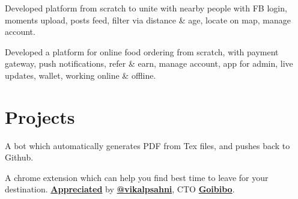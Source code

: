 \documentclass[a4paper]{deedy-resume} %
\begin{document}
\begin{minipage}[t]{0.66\textwidth}
    
    
    Developed platform from scratch to unite with nearby people with FB login, moments upload, posts feed, filter via distance \& age, locate on map, manage account.
    
    \sectionspace %
    
    
    
    Developed a platform for online food ordering from scratch, with payment gateway, push notifications, refer \& earn, manage account, app for admin, live updates, wallet, working online \& offline.
    
    \sectionspace %
    
    \section{Projects}
    
    A bot which automatically generates PDF from Tex files, and pushes back to Github.
    
    \sectionspace %
    
    A chrome extension which can help you find best time to leave for your destination. \href{https://twitter.com/vikalpsahni/status/1014346010200559617}{\bf Appreciated} by \href{https://twitter.com/vikalpsahni}{\bf @vikalpsahni}, CTO \href{https://goibibo.com}{\bf Goibibo}.
    

\end{minipage}
\end{document}
